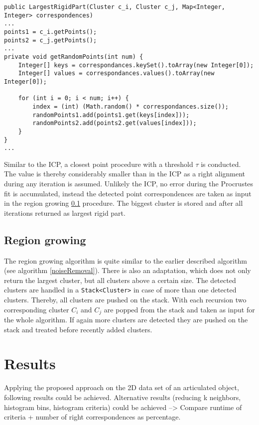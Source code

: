 \begin{lstlisting}
public LargestRigidPart(Cluster c_i, Cluster c_j, Map<Integer, Integer> correspondences)
...
points1 = c_i.getPoints();
points2 = c_j.getPoints();
...
private void getRandomPoints(int num) {
	Integer[] keys = correspondances.keySet().toArray(new Integer[0]);
	Integer[] values = correspondances.values().toArray(new Integer[0]);

	for (int i = 0; i < num; i++) {
		index = (int) (Math.random() * correspondances.size());
		randomPoints1.add(points1.get(keys[index]));
		randomPoints2.add(points2.get(values[index]));
	}
}
...
\end{lstlisting}

Similar to the ICP, a closest point procedure with a threshold $\tau$ is conducted. The value is thereby considerably smaller than in the ICP as a right alignment during any iteration is assumed. Unlikely the ICP, no error during the Procrustes fit is accumulated, instead the detected point correspondences are taken as input in the region growing \ref{RegionGrowing} procedure. The biggest cluster is stored and after all iterations returned as largest rigid part.

\subsection{Region growing}
\label{RegionGrowing}
The region growing algorithm is quite similar to the earlier described algorithm (see algorithm \ref{noiseRemoval}). There is also an adaptation, which does not only return the largest cluster, but all clusters above a certain size. The detected clusters are handled in a \texttt{Stack<Cluster>} in case of more than one detected clusters. Thereby, all clusters are pushed on the stack. With each recursion two corresponding cluster $C_i$ and $C_j$ are popped from the stack and taken as input for the whole algorithm. If again more clusters are detected they are pushed on the stack and treated before recently added clusters.

\section{Results}
\label{ResultsLRP}

Applying the proposed approach on the 2D data set of an articulated object, following results could be achieved. Alternative results (reducing k neighbors, histogram bins, histogram criteria) could be achieved --> Compare runtime of criteria + number of right correspondences as percentage.

